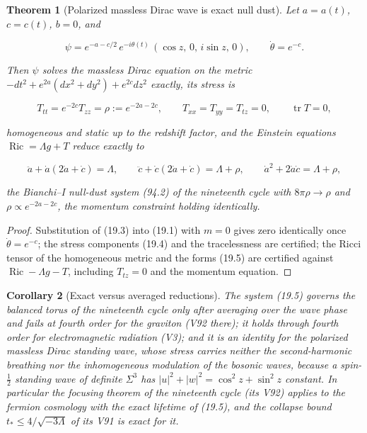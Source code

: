 \documentclass[11pt]{article}
\newtheorem{theorem}{Theorem}[section]
\newtheorem{corollary}[theorem]{Corollary}
\theoremstyle{remark}
\begin{document}
\begin{theorem}[Polarized massless Dirac wave is exact null dust]
\label{thm:v20v16-nulldust}
Let \(a=a(t)\), \(c=c(t)\), \(b=0\), and

\[
 \psi=e^{-a-c/2}\,e^{-i\theta(t)}\,(\cos z,\,0,\,i\sin z,\,0),\qquad \dot\theta=e^{-c}.
                                                                    \tag{19.3}
\]

Then \(\psi\) solves the massless Dirac equation on the metric
\(-dt^2+e^{2a}(dx^2+dy^2)+e^{2c}dz^2\) exactly, its stress is

\[
 T_{tt}=e^{-2c}T_{zz}=\rho:=e^{-2a-2c},\qquad T_{xx}=T_{yy}=T_{tz}=0,\qquad\operatorname{tr}T=0,
                                                                    \tag{19.4}
\]

homogeneous and static up to the redshift factor, and the Einstein
equations \(\operatorname{Ric}=\Lambda g+T\) reduce exactly to

\[
 \ddot a+\dot a(2\dot a+\dot c)=\Lambda,\qquad
 \ddot c+\dot c(2\dot a+\dot c)=\Lambda+\rho,\qquad
 \dot a^2+2\dot a\dot c=\Lambda+\rho,                                 \tag{19.5}
\]

the Bianchi--I null-dust system (94.2) of the nineteenth cycle with
\(8\pi\rho\to\rho\) and \(\rho\propto e^{-2a-2c}\), the momentum
constraint holding identically.
\end{theorem}

\begin{proof}
Substitution of (19.3) into (19.1) with \(m=0\) gives zero identically
once \(\dot\theta=e^{-c}\); the stress components (19.4) and the
tracelessness are certified; the Ricci tensor of the homogeneous
metric and the forms (19.5) are certified against
\(\operatorname{Ric}-\Lambda g-T\), including \(T_{tz}=0\) and the
momentum equation.
\end{proof}

\begin{corollary}[Exact versus averaged reductions]
\label{cor:v20v16-comparison}
The system (19.5) governs the balanced torus of the nineteenth cycle
only after averaging over the wave phase and fails at fourth order for
the graviton (V92 there); it holds through fourth order for
electromagnetic radiation (V3); and it is an identity for the
polarized massless Dirac standing wave, whose stress carries neither
the second-harmonic breathing nor the inhomogeneous modulation of the
bosonic waves, because a spin-\(\tfrac12\) standing wave of definite
\(\Sigma^3\) has \(|u|^2+|w|^2=\cos^2z+\sin^2z\) constant.  In
particular the focusing theorem of the nineteenth cycle (its V92)
applies to the fermion cosmology with the exact lifetime of (19.5),
and the collapse bound \(t_*\leq4/\sqrt{-3\Lambda}\) of its V91 is
exact for it.
\end{corollary}
\end{document}
